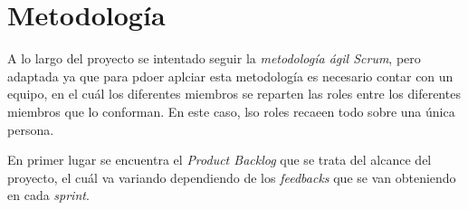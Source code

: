
\section{Metodología}
A lo largo del proyecto se intentado seguir la \textit{metodología ágil Scrum}, pero adaptada ya que para pdoer aplciar esta metodología es necesario contar con un equipo, en el cuál los diferentes miembros se reparten las roles entre los diferentes miembros que lo conforman. En este caso, lso roles recaeen todo sobre una única persona.


En primer lugar se encuentra el \textit{Product Backlog} \cite{scrum} que se trata del alcance del proyecto, el cuál va variando dependiendo de los \textit{feedbacks} que se van obteniendo en cada \textit{sprint}.